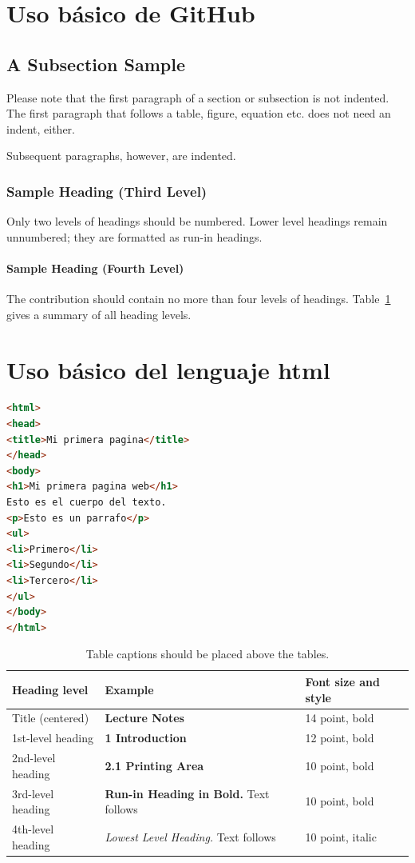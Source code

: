 \documentclass[runningheads]{llncs}
\begin{document}
\section{Uso básico de GitHub}
\subsection{A Subsection Sample}
Please note that the first paragraph of a section or subsection is
not indented. The first paragraph that follows a table, figure,
equation etc. does not need an indent, either.

Subsequent paragraphs, however, are indented.

\subsubsection{Sample Heading (Third Level)} Only two levels of
headings should be numbered. Lower level headings remain unnumbered;
they are formatted as run-in headings.

\paragraph{Sample Heading (Fourth Level)}
The contribution should contain no more than four levels of
headings. Table~\ref{tab1} gives a summary of all heading levels.
\section{Uso básico del lenguaje html}

\begin{lstlisting}[language=HTML]
<html>
<head>
<title>Mi primera pagina</title>
</head>
<body>
<h1>Mi primera pagina web</h1>
Esto es el cuerpo del texto.
<p>Esto es un parrafo</p>
<ul>
<li>Primero</li>
<li>Segundo</li>
<li>Tercero</li>
</ul>
</body>
</html>
\end{lstlisting}


\begin{table}
\caption{Table captions should be placed above the
tables.}\label{tab1}
\begin{tabular}{|l|l|l|}
\hline
Heading level &  Example & Font size and style\\
\hline
Title (centered) &  {\Large\bfseries Lecture Notes} & 14 point, bold\\
1st-level heading &  {\large\bfseries 1 Introduction} & 12 point, bold\\
2nd-level heading & {\bfseries 2.1 Printing Area} & 10 point, bold\\
3rd-level heading & {\bfseries Run-in Heading in Bold.} Text follows & 10 point, bold\\
4th-level heading & {\itshape Lowest Level Heading.} Text follows & 10 point, italic\\
\hline
\end{tabular}
\end{table}
\end{document}
